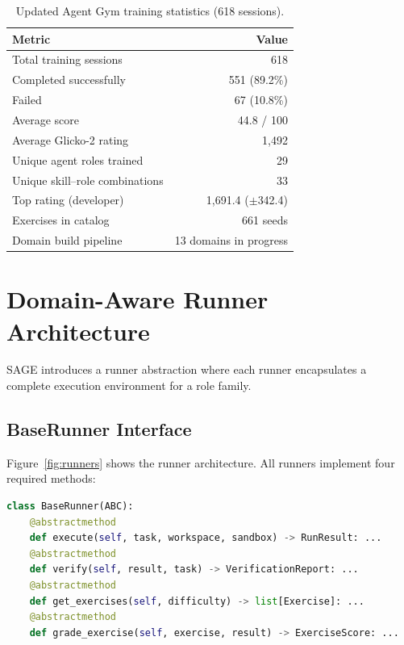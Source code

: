 \documentclass[11pt,a4paper]{article}
\begin{document}
\begin{table}[h]
\centering
\small
\caption{Updated Agent Gym training statistics (618 sessions).}
\label{tab:gym-updated}
\begin{tabular}{@{}lr@{}}
\toprule
Metric & Value \\
\midrule
Total training sessions      & 618 \\
Completed successfully       & 551 (89.2\%) \\
Failed                       & 67 (10.8\%) \\
Average score                & 44.8 / 100 \\
Average Glicko-2 rating      & 1,492 \\
Unique agent roles trained   & 29 \\
Unique skill--role combinations & 33 \\
Top rating (developer)       & 1,691.4 ($\pm$342.4) \\
Exercises in catalog         & 661 seeds \\
Domain build pipeline        & 13 domains in progress \\
\bottomrule
\end{tabular}
\end{table}

\section{Domain-Aware Runner Architecture}
\label{sec:runners}

SAGE introduces a runner abstraction where each runner encapsulates a complete execution environment for a role family.

\subsection{BaseRunner Interface}

Figure~\ref{fig:runners} shows the runner architecture. All runners implement four required methods:

\begin{lstlisting}[language=Python, caption={BaseRunner abstract interface.}]
class BaseRunner(ABC):
    @abstractmethod
    def execute(self, task, workspace, sandbox) -> RunResult: ...
    @abstractmethod
    def verify(self, result, task) -> VerificationReport: ...
    @abstractmethod
    def get_exercises(self, difficulty) -> list[Exercise]: ...
    @abstractmethod
    def grade_exercise(self, exercise, result) -> ExerciseScore: ...
\end{lstlisting}
\end{document}
